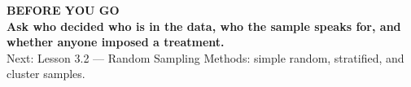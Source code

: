\documentclass[aspectratio=169, 11pt]{beamer}
\begin{document}
{
\begin{frame}[plain]
  \vspace{1.5cm}\hspace{0.8cm}%
  \begin{minipage}{0.86\textwidth}
    {\color{goldacc}\bfseries\small BEFORE YOU GO}\\[0.7cm]
    {\color{white}\bfseries\Large Ask who decided who is in the data, who the sample speaks for,
    and whether anyone imposed a treatment.}\\[0.9cm]
    {\color{skymid}\small Next: Lesson 3.2 --- Random Sampling Methods: simple random,
    stratified, and cluster samples.}
  \end{minipage}
\end{frame}
}
\end{document}
